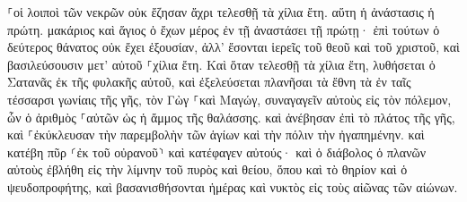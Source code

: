 \documentclass{openreader}
\begin{document}
⸀οἱ λοιποὶ τῶν νεκρῶν οὐκ ἔζησαν ἄχρι τελεσθῇ τὰ χίλια ἔτη. αὕτη ἡ ἀνάστασις ἡ πρώτη. 
μακάριος καὶ ἅγιος ὁ ἔχων μέρος ἐν τῇ ἀναστάσει τῇ πρώτῃ· ἐπὶ τούτων ὁ δεύτερος θάνατος οὐκ ἔχει ἐξουσίαν, ἀλλ’ ἔσονται ἱερεῖς τοῦ θεοῦ καὶ τοῦ χριστοῦ, καὶ βασιλεύσουσιν μετ’ αὐτοῦ ⸀χίλια ἔτη. 
Καὶ ὅταν τελεσθῇ τὰ χίλια ἔτη, λυθήσεται ὁ Σατανᾶς ἐκ τῆς φυλακῆς αὐτοῦ, 
καὶ ἐξελεύσεται πλανῆσαι τὰ ἔθνη τὰ ἐν ταῖς τέσσαρσι γωνίαις τῆς γῆς, τὸν Γὼγ ⸀καὶ Μαγώγ, συναγαγεῖν αὐτοὺς εἰς τὸν πόλεμον, ὧν ὁ ἀριθμὸς ⸀αὐτῶν ὡς ἡ ἄμμος τῆς θαλάσσης. 
καὶ ἀνέβησαν ἐπὶ τὸ πλάτος τῆς γῆς, καὶ ⸀ἐκύκλευσαν τὴν παρεμβολὴν τῶν ἁγίων καὶ τὴν πόλιν τὴν ἠγαπημένην. καὶ κατέβη πῦρ ⸂ἐκ τοῦ οὐρανοῦ⸃ καὶ κατέφαγεν αὐτούς· 
καὶ ὁ διάβολος ὁ πλανῶν αὐτοὺς ἐβλήθη εἰς τὴν λίμνην τοῦ πυρὸς καὶ θείου, ὅπου καὶ τὸ θηρίον καὶ ὁ ψευδοπροφήτης, καὶ βασανισθήσονται ἡμέρας καὶ νυκτὸς εἰς τοὺς αἰῶνας τῶν αἰώνων. 
\end{document}

